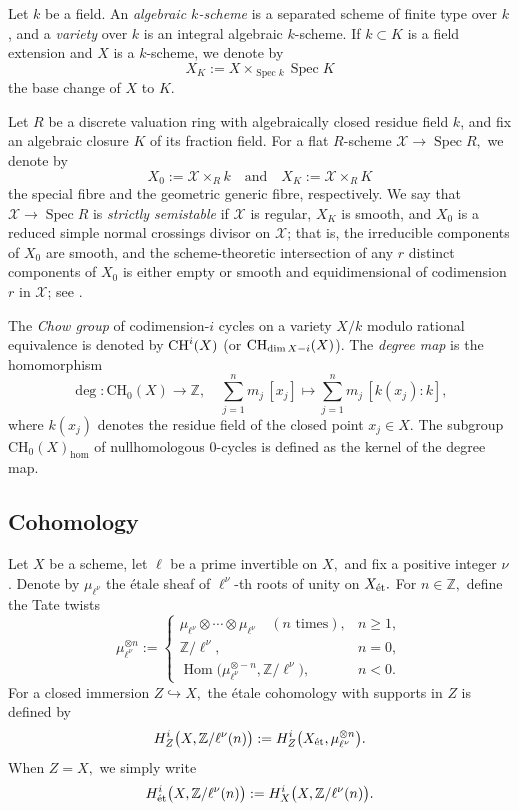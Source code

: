 \documentclass[11pt,letterpaper]{amsart}
\newcommand{\et}{\textnormal{\'et}}
\newcommand{\CH}{\textnormal{CH}}
\numberwithin{equation}{section}
\theoremstyle{definition}
\theoremstyle{remark}
\newcommand{\Z}{\mathbb{Z}}
\newcommand{\Ch}{\operatorname{CH_{0}}}
\DeclareMathOperator{\Hom}{Hom}
\DeclareMathOperator{\Spec}{Spec}
\begin{document}
Let $k$ be a field. An \emph{algebraic $k$-scheme} is a separated scheme of finite type over $k$, and a \emph{variety} over $k$ is an integral algebraic $k$-scheme. If $k \subset K$ is a field extension and $X$ is a $k$-scheme, we denote by
$$
X_K := X \times_{\Spec k} \Spec K
$$
the base change of $X$ to $K$.\par
Let $R$ be a discrete valuation ring with algebraically closed residue field $k$, and fix an algebraic
closure $K$ of its fraction field. For a flat $R$-scheme
$\mathcal{X} \to \Spec R,$ we denote by
$$
X_0 := \mathcal{X} \times_R k
\quad\text{and}\quad
X_K := \mathcal{X} \times_R K
$$
the special fibre and the geometric generic fibre, respectively. We say that
$\mathcal{X} \to \Spec R$ is \emph{strictly semistable} if $\mathcal{X}$ is regular, $X_K$ is smooth,
and $X_0$ is a reduced simple normal crossings divisor on $\mathcal{X}$; that is, the irreducible
components of $X_0$ are smooth, and the scheme-theoretic intersection of any $r$ distinct components
of $X_0$ is either empty or smooth and equidimensional of codimension $r$ in $\mathcal{X}$; see \cite[Definition 1.1]{Hartl2001SemistabilityAB}.\par
The \emph{Chow group} of codimension-$i$ cycles on a variety $X/k$ modulo rational equivalence is denoted by $\CH^{i}(X)$ (or $\CH_{\dim X-i}(X)$). The \emph{degree map} is the homomorphism $$\deg\colon \Ch(X)\longrightarrow\Z,\quad \sum_{j=1}^{n}m_{j}\,[x_{j}]\longmapsto \sum_{j=1}^{n}m_{j}\,[k(x_{j}):k],$$ where $k(x_j)$ denotes the residue field of the closed point $x_j\in X$. The subgroup $\Ch(X)_{\hom}$ of nullhomologous $0$-cycles is defined as the kernel of the degree map.

\subsection{Cohomology}\label{subsec:cohomology} Let $X$ be a scheme, let $\ell$ be a prime invertible on $X,$ and fix a positive integer $\nu$. Denote by $\mu_{\ell^{\nu}}$ the \'etale sheaf of $\ell^\nu$-th roots of unity on $X_{\et}.$ For $n\in\Z,$ define the Tate twists
$$\mu^{\otimes n}_{\ell^{\nu}}:=\begin{cases} \mu_{\ell^{\nu}}\otimes\cdots\otimes\mu_{\ell^{\nu}}\quad (n\text{ times}), & n\ge1,\\
\Z/\ell^{\nu}, & n=0,\\
\Hom\bigl(\mu^{\otimes -n}_{\ell^{\nu}}, \Z/\ell^{\nu}\bigr), & n<0.
\end{cases}$$
For a closed immersion $Z\hookrightarrow X,$ the \'etale cohomology with supports in $Z$ is defined by 
\begin{equation}\label{eq:coh_support}
    H^{i}_{Z}\bigl(X,\Z/\ell^{\nu}(n)\bigr):= H^{i}_{Z}\bigl(X_{\et},\mu^{\otimes n}_{\ell^{\nu}}\bigr).
\end{equation}
When $Z=X,$ we simply write 
\begin{equation}\label{eq:etale_cohomology}
    H^{i}_{\et}\bigl(X,\Z/\ell^{\nu}(n)\bigr):=H^{i}_{X}\bigl(X,\Z/\ell^{\nu}(n)\bigr).\end{equation} 
\end{document}
